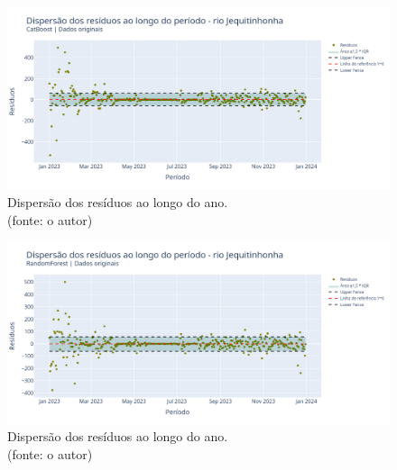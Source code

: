 \begin{figure}[!h]
\centering
\includegraphics[scale=0.33]{Figuras/jequiti/wfv/CB/CB_WFV_ORIG_RESID_x_TEMPO.png}
\caption{Dispersão dos resíduos ao longo do ano.\\(fonte: o autor)}
\label{fig:jequiti_CB_WFV_ORIG_RESID_x_TEMPO}
\end{figure}

\begin{figure}[!h]
\centering
\includegraphics[scale=0.33]{Figuras/jequiti/wfv/RF/RF_WFV_ORIG_RESID_x_TEMPO.png}
\caption{Dispersão dos resíduos ao longo do ano.\\(fonte: o autor)}
\label{fig:jequiti_RF_WFV_ORIG_RESID_x_TEMPO}
\end{figure}
\clearpage

